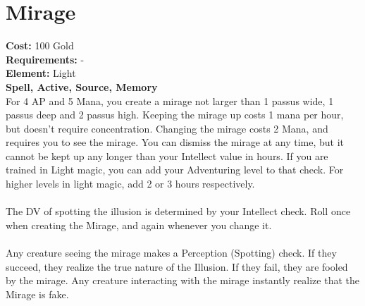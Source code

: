 \section{Mirage}
\textbf{Cost:} 100 Gold\\
\textbf{Requirements:} -\\
\textbf{Element:} Light\\
\textbf{Spell, Active, Source, Memory}\\
For 4 AP and 5 Mana, you create a mirage not larger than 1 passus wide, 1 passus deep and 2 passus high. Keeping the mirage up costs 1 mana per hour, but doesn't require concentration. Changing the mirage costs 2 Mana, and requires you to see the mirage. You can dismiss the mirage at any time, but it cannot be kept up any longer than your Intellect value in hours. If you are trained in Light magic, you can add your Adventuring level to that check. For higher levels in light magic, add 2 or 3 hours respectively.\\
\\
The DV of spotting the illusion is determined by your Intellect check. Roll once when creating the Mirage, and again whenever you change it. \\
\\
Any creature seeing the mirage makes a Perception (Spotting) check. If they succeed, they realize the true nature of the Illusion. If they fail, they are fooled by the mirage. Any creature interacting with the mirage instantly realize that the Mirage is fake.\\